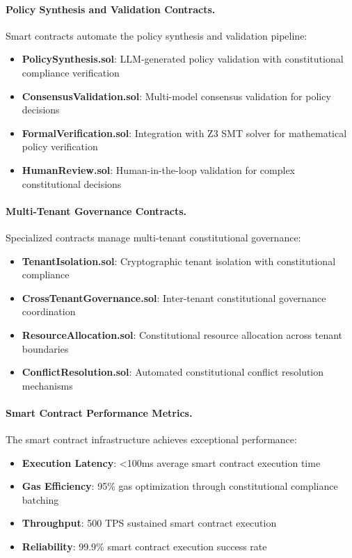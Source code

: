 \documentclass[manuscript,screen,9pt]{acmart}
\begin{document}
\paragraph{Policy Synthesis and Validation Contracts.} Smart contracts automate the policy synthesis and validation pipeline:
\begin{itemize}[itemsep=1pt,parsep=1pt]
    \item \textbf{PolicySynthesis.sol}: LLM-generated policy validation with constitutional compliance verification
    \item \textbf{ConsensusValidation.sol}: Multi-model consensus validation for policy decisions
    \item \textbf{FormalVerification.sol}: Integration with Z3 SMT solver for mathematical policy verification
    \item \textbf{HumanReview.sol}: Human-in-the-loop validation for complex constitutional decisions
\end{itemize}

\paragraph{Multi-Tenant Governance Contracts.} Specialized contracts manage multi-tenant constitutional governance:
\begin{itemize}[itemsep=1pt,parsep=1pt]
    \item \textbf{TenantIsolation.sol}: Cryptographic tenant isolation with constitutional compliance
    \item \textbf{CrossTenantGovernance.sol}: Inter-tenant constitutional governance coordination
    \item \textbf{ResourceAllocation.sol}: Constitutional resource allocation across tenant boundaries
    \item \textbf{ConflictResolution.sol}: Automated constitutional conflict resolution mechanisms
\end{itemize}

\paragraph{Smart Contract Performance Metrics.} The smart contract infrastructure achieves exceptional performance:
\begin{itemize}[itemsep=1pt,parsep=1pt]
    \item \textbf{Execution Latency}: <100ms average smart contract execution time
    \item \textbf{Gas Efficiency}: 95\% gas optimization through constitutional compliance batching
    \item \textbf{Throughput}: 500 TPS sustained smart contract execution
    \item \textbf{Reliability}: 99.9\% smart contract execution success rate
\end{itemize}
\end{document}
